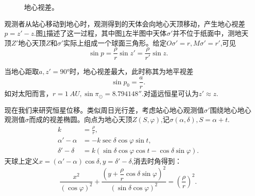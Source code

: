 \documentclass[11pt, a4paper, oneside]{ctexart}
\numberwithin{equation}{subsection}
\begin{document}
\begin{figure}[!htbp]
\begin{minipage}[t]{0.45\textwidth}
\end{minipage}
\begin{minipage}[t]{0.45\textwidth}
\end{minipage}
\captionsetup{justification=raggedright, singlelinecheck=false}
\caption{地心视差。}
\label{地心视差。}
\end{figure}

观测者从站心移动到地心时，观测得到的天体会向地心天顶移动，产生地心视差$p=z'-z$.图\ref{地心视差。}描述了这一过程，其中图\ref{地心视差。}左半图中天体$\sigma'$并不位于纸面中，测地天顶$Z'$地心天顶$Z$和$\sigma'$实际上组成一个球面三角形。给定$O\sigma'=r,M\sigma'=r'$,可见
\begin{equation}
\sin p=\frac{\rho}{r}\sin z'=\frac{\rho}{r'}\sin z.
\end{equation}

当地心距取$a,z'=\ang{90;;}$时，地心视差最大，此时称其为地平视差
\begin{equation}
\sin p_{0}=\frac{a}{r}.
\end{equation}
如对太阳而言，$r=\qty{1}{AU},\sin\pi_{\odot}=\ang{;;8.794148}$.对遥远恒星可认为$z'\approx z$.

现在我们来研究恒星位移。类似周日光行差，考虑站心地心观测值$\sigma'$围绕地心地心观测值$\sigma$而成的视差椭圆。向点为地心天顶$Z\left(S,\varphi\right)$,记$\sigma\left(\alpha,\delta{}\right),S=\alpha+t$.
\begin{align}
k&=\frac{\rho}{r},\\
\alpha'-\alpha&=-k\sec\delta\cos\varphi\sin t,\\
\delta'-\delta&=k\left(\sin\delta\cos\varphi\cos t-\cos\delta\sin\varphi\right).
\end{align}
天球上定义$x=\left(\alpha'-\alpha\right)\cos\delta,y=\delta'-\delta$,消去时角得到：
\begin{equation}
\frac{x^2}{\left(\cos\varphi\right)^2}+\frac{\left(y+\dfrac{\rho}{r}\cos\delta\sin\varphi\right)^2}{\left(\sin\delta\cos\varphi\right)^2}=\left(\frac{\rho}{r}\right)^{2}.
\end{equation}
\end{document}
